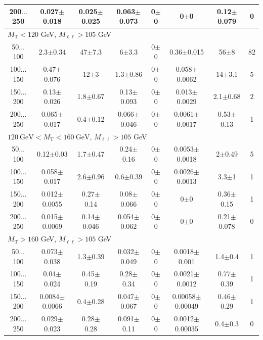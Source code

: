 \begin{landscape}
\begin{table}
\begin{center}
\begin{tabular}{| c | c c c c c c c | }
200$\dots$250&0.027$\pm$0.018&0.025$\pm$0.025&0.063$\pm$0.073&0$\pm$0&0$\pm$0&0.12$\pm$0.079&0\\
\hline\hline
\multicolumn{8}{l}{$M_{\text{T}} < 120$ GeV, $M_{\ell\ell} > 105$ GeV}\\\hline\hline
50$\dots$100&2.3$\pm$0.34&47$\pm$7.3&6$\pm$3.3&0$\pm$0&0.36$\pm$0.015&56$\pm$8&82\\
100$\dots$150&0.47$\pm$0.076&12$\pm$3&1.3$\pm$0.86&0$\pm$0&0.058$\pm$0.0062&14$\pm$3.1&5\\
150$\dots$200&0.13$\pm$0.026&1.8$\pm$0.67&0.13$\pm$0.093&0$\pm$0&0.013$\pm$0.0029&2.1$\pm$0.68&2\\
200$\dots$250&0.065$\pm$0.017&0.4$\pm$0.12&0.066$\pm$0.046&0$\pm$0&0.0061$\pm$0.0017&0.53$\pm$0.13&1\\
\hline\hline
\multicolumn{8}{l}{$120~\mathrm{GeV} < M_{\text{T}} < 160~\mathrm{GeV}$, $M_{\ell\ell} > 105$ GeV}\\\hline\hline
50$\dots$100&0.12$\pm$0.03&1.7$\pm$0.47&0.24$\pm$0.16&0$\pm$0&0.0053$\pm$0.0018&2$\pm$0.49&5\\
100$\dots$150&0.058$\pm$0.017&2.6$\pm$0.96&0.6$\pm$0.39&0$\pm$0&0.0026$\pm$0.0013&3.3$\pm$1&1\\
150$\dots$200&0.012$\pm$0.0055&0.27$\pm$0.14&0.08$\pm$0.066&0$\pm$0&0$\pm$0&0.36$\pm$0.15&1\\
200$\dots$250&0.015$\pm$0.0069&0.14$\pm$0.046&0.054$\pm$0.062&0$\pm$0&0$\pm$0&0.21$\pm$0.078&0\\
\hline\hline
\multicolumn{8}{l}{$M_{\text{T}} > 160$ GeV, $M_{\ell\ell} > 105$ GeV}\\\hline\hline
50$\dots$100&0.073$\pm$0.038&1.3$\pm$0.39&0.032$\pm$0.049&0$\pm$0&0.0018$\pm$0.001&1.4$\pm$0.4&1\\
100$\dots$150&0.04$\pm$0.024&0.45$\pm$0.19&0.28$\pm$0.34&0$\pm$0&0.0021$\pm$0.0012&0.77$\pm$0.39&1\\
150$\dots$200&0.0084$\pm$0.0066&0.4$\pm$0.28&0.047$\pm$0.067&0$\pm$0&0.00058$\pm$0.00049&0.46$\pm$0.29&1\\
200$\dots$250&0.029$\pm$0.023&0.28$\pm$0.28&0.091$\pm$0.11&0$\pm$0&0.0012$\pm$0.00035&0.4$\pm$0.3&0\\
\hline\hline
\end{tabular}
\end{center}
\end{table}
\end{landscape}